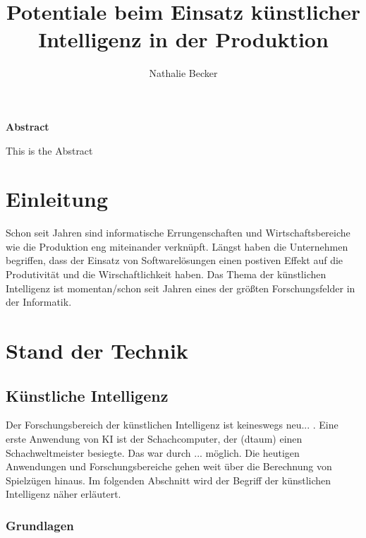 \documentclass[a4paper,12pt, german]{report}
\begin{document}
\title{Potentiale beim Einsatz künstlicher Intelligenz in der Produktion}
\author{Nathalie Becker}


\begin{titlepage}
\maketitle
\end{titlepage}


\begin{center}
\textbf{Abstract}
\end{center}
This is the Abstract


\tableofcontents
\printacronyms

\chapter{Einleitung}

Schon seit Jahren sind informatische Errungenschaften und Wirtschaftsbereiche wie die Produktion eng miteinander verknüpft. Längst haben die Unternehmen begriffen, dass der Einsatz von Softwarelösungen einen postiven Effekt auf die Produtivität und die Wirschaftlichkeit haben.
Das Thema der künstlichen Intelligenz ist momentan/schon seit Jahren eines der größten Forschungsfelder in der Informatik. 


\chapter{Stand der Technik}

\section{Künstliche Intelligenz}

Der Forschungsbereich der künstlichen Intelligenz ist keineswegs neu... . Eine erste Anwendung von KI ist der Schachcomputer, der (dtaum) einen Schachweltmeister besiegte. Das war durch ... möglich. Die heutigen Anwendungen und Forschungsbereiche gehen weit über die Berechnung von Spielzügen hinaus. Im folgenden Abschnitt wird der Begriff der künstlichen Intelligenz näher erläutert. \cite{01}


\subsection{Grundlagen}

\end{document}
